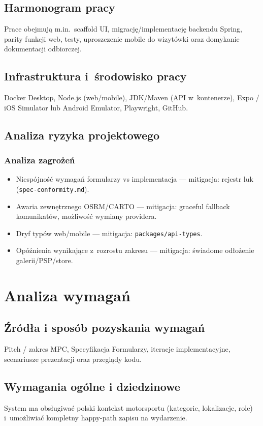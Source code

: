 \documentclass{sprz}
\begin{document}
\section{Harmonogram pracy}
Prace obejmują m.in.\ scaffold UI, migrację/implementację backendu Spring, parity funkcji web, testy, uproszczenie mobile do wizytówki oraz domykanie dokumentacji odbiorczej.

\section{Infrastruktura i~środowisko pracy}
Docker Desktop, Node.js (web/mobile), JDK/Maven (API w~kontenerze), Expo / iOS Simulator lub Android Emulator, Playwright, GitHub.

\section{Analiza ryzyka projektowego}
\subsection{Analiza zagrożeń}
\begin{itemize}
  \item Niespójność wymagań formularzy vs implementacja --- mitigacja: rejestr luk (\texttt{spec-conformity.md}).
  \item Awaria zewnętrznego OSRM/CARTO --- mitigacja: graceful fallback komunikatów, możliwość wymiany providera.
  \item Dryf typów web/mobile --- mitigacja: \texttt{packages/api-types}.
  \item Opóźnienia wynikające z~rozrostu zakresu --- mitigacja: świadome odłożenie galerii/PSP/store.
\end{itemize}

\chapter{Analiza wymagań}
\section{Źródła i sposób pozyskania wymagań}
Pitch / zakres MPC, Specyfikacja Formularzy, iteracje implementacyjne, scenariusze prezentacji oraz przeglądy kodu.

\section{Wymagania ogólne i dziedzinowe}
System ma obsługiwać polski kontekst motorsportu (kategorie, lokalizacje, role) i~umożliwiać kompletny happy-path zapisu na wydarzenie.
\end{document}
